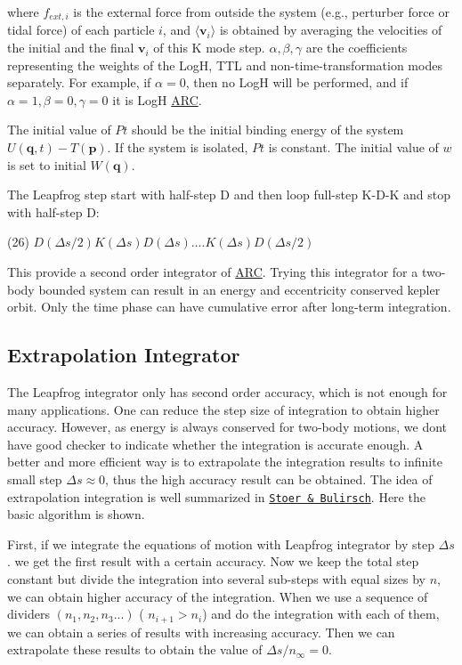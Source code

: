 where $ f_{ext,i} $ is the external force from outside the system (e.\+g., perturber force or tidal force) of each particle $ i$, and $ \langle \mathbf{v}_i \rangle$ is obtained by averaging the velocities of the initial and the final $ \mathbf{v}_i $ of this K mode step. $ \alpha, \beta, \gamma $ are the coefficients representing the weights of the LogH, T\+TL and non-\/time-\/transformation modes separately. For example, if $ \alpha=0$, then no LogH will be performed, and if $ \alpha =1, \beta=0, \gamma=0 $ it is LogH \hyperlink{namespaceARC}{A\+RC}.

The initial value of $ Pt $ should be the initial binding energy of the system $ U(\mathbf{q},t) - T(\mathbf{p}) $. If the system is isolated, $ Pt $ is constant. The initial value of $ w$ is set to initial $ W(\mathbf{q}) $.

The Leapfrog step start with half-\/step D and then loop full-\/step K-\/\+D-\/K and stop with half-\/step D\+:

(26) $ D(\Delta s/2)K(\Delta s)D(\Delta s)....K(\Delta s)D(\Delta s/2) $

This provide a second order integrator of \hyperlink{namespaceARC}{A\+RC}. Trying this integrator for a two-\/body bounded system can result in an energy and eccentricity conserved kepler orbit. Only the time phase can have cumulative error after long-\/term integration.\hypertarget{index_extrapolation_sec}{}\subsection{Extrapolation Integrator}\label{index_extrapolation_sec}
The Leapfrog integrator only has second order accuracy, which is not enough for many applications. One can reduce the step size of integration to obtain higher accuracy. However, as energy is always conserved for two-\/body motions, we don\textquotesingle{}t have good checker to indicate whether the integration is accurate enough. A better and more efficient way is to extrapolate the integration results to infinite small step $ \Delta s\approx 0$, thus the high accuracy result can be obtained. The idea of extrapolation integration is well summarized in \href{http://link.springer.com/book/10.1007%2F978-0-387-21738-3}{\tt Stoer \& Bulirsch}. Here the basic algorithm is shown.

First, if we integrate the equations of motion with Leapfrog integrator by step $ \Delta s$. we get the first result with a certain accuracy. Now we keep the total step constant but divide the integration into several sub-\/steps with equal sizes by $ n $, we can obtain higher accuracy of the integration. When we use a sequence of dividers $ (n_1, n_2, n_3 ...)$ ( $ n_{i+1}>n_i$) and do the integration with each of them, we can obtain a series of results with increasing accuracy. Then we can extrapolate these results to obtain the value of $ \Delta s/n_{\infty}=0 $.


